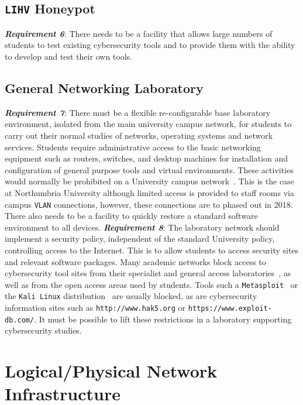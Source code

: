 \documentclass[10pt,journal]{IEEEtran}
\begin{document}
\subsection{\texttt{LIHV} Honeypot}\label{subsec:LabHoneypot}

\noindent\textit{\textbf{Requirement 6}}:
There needs to be a facility that allows large numbers of students to test
existing cybersecurity tools and to provide them with the ability to develop
and test their own tools.

\subsection{General Networking Laboratory}\label{subsec:GeneralLab}

\noindent\textit{\textbf{Requirement 7}}: There must be a flexible re-configurable base laboratory environment, isolated from the main university campus network, for students to carry out their normal
studies of networks, operating systems and network services. Students require
administrative access to the basic networking equipment such as routers,
switches, and desktop machines for installation and configuration of general
purpose tools and virtual environments. These activities would normally be
prohibited on a University campus network~\cite{MGDL:13}. This is the case at Northumbria University although limited access is provided to staff rooms via campus \texttt{VLAN} connections, however, these connections are to phased out in 2018. There also needs to be a facility to quickly restore a standard software environment to all devices.
\newline\newline
\noindent\textit{\textbf{Requirement 8}}: The laboratory network should implement a security policy, independent of the
standard University policy, controlling access to the Internet. This is to
allow students to access security sites and relevant software packages. Many
academic networks block access to cybersecurity tool sites from their
specialist and general access laboratories~\cite{ACGO:06,YYLCHJ:04}, as well as
from the open access areas used by students. Tools such a
\texttt{Metasploit}~\cite{R7:17} or the \texttt{Kali Linux}
distribution~\cite{OS:17} are usually blocked, as are cybersecurity information
sites such as \texttt{http://www.hak5.org} or
\texttt{https://www.exploit-db.com/}. It must be possible to lift these
restrictions in a laboratory supporting cybersecurity studies.

\section{Logical/Physical Network Infrastructure}\label{sec:LogicalDesign}
\end{document}

